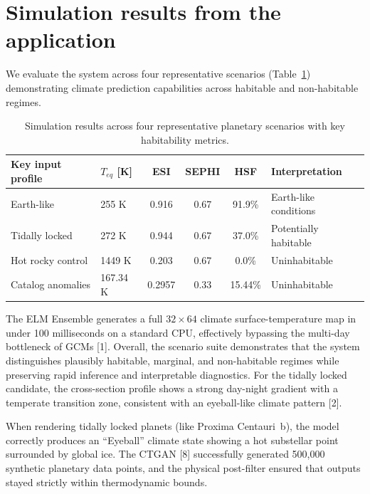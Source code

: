 \documentclass[12pt, a4paper]{article}
\begin{document}
\section{Simulation results from the application}

We evaluate the system across four representative scenarios (Table~\ref{tab:scenarios}) demonstrating climate prediction capabilities across habitable and non-habitable regimes.

\begin{table}[H]
    \centering
    \begin{tabularx}{\textwidth}{l l c c c X}
        \toprule
        \textbf{Key input profile} & \textbf{$T_{eq}$ [K]} & \textbf{ESI} & \textbf{SEPHI} & \textbf{HSF} & \textbf{Interpretation} \\
        \midrule
        Earth-like & 255 K & 0.916 & 0.67 & 91.9\% & Earth-like conditions \\
        Tidally locked & 272 K & 0.944 & 0.67 & 37.0\% & Potentially habitable \\
        Hot rocky control & 1449 K & 0.203 & 0.67 & 0.0\% & Uninhabitable \\
        Catalog anomalies & 167.34 K & 0.2957 & 0.33 & 15.44\% & Uninhabitable \\
        \bottomrule
    \end{tabularx}
    \caption{Simulation results across four representative planetary scenarios with key habitability metrics.}
    \label{tab:scenarios}
\end{table}

The ELM Ensemble generates a full $32 \times 64$ climate surface-temperature map in under 100 milliseconds on a standard CPU, effectively bypassing the multi-day bottleneck of GCMs [1]. Overall, the scenario suite demonstrates that the system distinguishes plausibly habitable, marginal, and non-habitable regimes while preserving rapid inference and interpretable diagnostics. For the tidally locked candidate, the cross-section profile shows a strong day-night gradient with a temperate transition zone, consistent with an eyeball-like climate pattern [2].

When rendering tidally locked planets (like Proxima Centauri~b), the model correctly produces an ``Eyeball'' climate state showing a hot substellar point surrounded by global ice. The CTGAN [8] successfully generated 500,000 synthetic planetary data points, and the physical post-filter ensured that outputs stayed strictly within thermodynamic bounds.
\end{document}
